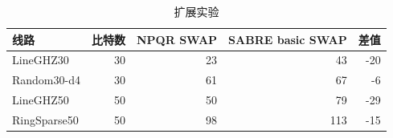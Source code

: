 \begin{table}[H]
  \centering
  \caption{扩展实验}
  \label{tab:scale-smoke}
  \begin{tabular}{lrrrr}
    \toprule
    线路 & 比特数 & NPQR SWAP & SABRE basic SWAP & 差值 \\
    \midrule
    LineGHZ30 & 30 & 23 & 43 & -20 \\
    Random30-d4 & 30 & 61 & 67 & -6 \\
    LineGHZ50 & 50 & 50 & 79 & -29 \\
    RingSparse50 & 50 & 98 & 113 & -15 \\
    \bottomrule
  \end{tabular}
\end{table}
